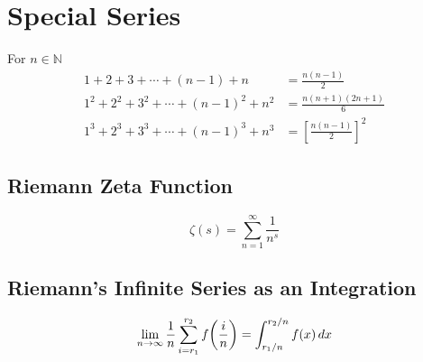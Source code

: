 \section{Special Series}
For $n\in\mathbb{N}$
\begin{align}
	1 + 2 + 3 + \cdots + (n-1) + n &= \frac{n(n-1)}{2}\\
	1^2 + 2^2 + 3^2 + \cdots + (n-1)^2 + n^2 &= \frac{n(n + 1)(2n + 1)}{6}\\
	1^3 + 2^3 + 3^3 + \cdots + (n-1)^3 + n^3 &= \left[\frac{n(n-1)}{2}\right]^2
\end{align}

\subsection{Riemann Zeta Function}
\begin{equation}
	\zeta(s)=\sum_{n=1}^\infty \frac{1}{n^s}
\end{equation}

\subsection{Riemann's Infinite Series as an Integration}
\label{sec:riemann_sum}
\begin{equation}
	\lim_{n\to\infty} \frac{1}{n}\sum_{i=r_1}^{r_2} f\left(\frac{i}{n}\right) = \int_{\flatfrac{r_1}{n}}^{\flatfrac{r_2}{n}} f(x) \dd x
\end{equation}
